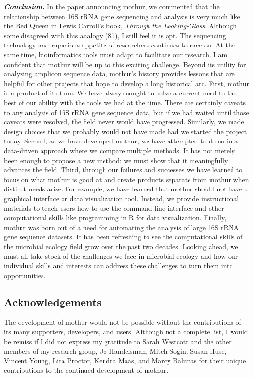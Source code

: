 \documentclass[11pt,]{article}
\begin{document}
\textbf{\emph{Conclusion.}} In the paper announcing mothur, we commented
that the relationship between 16S rRNA gene sequencing and analysis is
very much like the Red Queen in Lewis Carroll's book, \emph{Through the
Looking-Glass}. Although some disagreed with this analogy (81), I still
feel it is apt. The sequencing technology and rapacious appetite of
researchers continues to race on. At the same time, bioinformatics tools
must adapt to facilitate our research. I am confident that mothur will
be up to this exciting challenge. Beyond its utility for analyzing
amplicon sequence data, mothur's history provides lessons that are
helpful for other projects that hope to develop a long historical arc.
First, mothur is a product of its time. We have always sought to solve a
current need to the best of our ability with the tools we had at the
time. There are certainly caveats to any analysis of 16S rRNA gene
sequence data, but if we had waited until those caveats were resolved,
the field never would have progressed. Similarly, we made design choices
that we probably would not have made had we started the project today.
Second, as we have developed mothur, we have attempted to do so in a
data-driven approach where we compare multiple methods. It has not
merely been enough to propose a new method: we must show that it
meaningfully advances the field. Third, through our failures and
successes we have learned to focus on what mothur is good at and create
products separate from mothur when distinct needs arise. For example, we
have learned that mothur should not have a graphical interface or data
visualization tool. Instead, we provide instructional materials to teach
users how to use the command line interface and other computational
skills like programming in R for data visualization. Finally, mothur was
born out of a need for automating the analysis of large 16S rRNA gene
sequence datasets. It has been refreshing to see the computational
skills of the microbial ecology field grow over the past two decades.
Looking ahead, we must all take stock of the challenges we face in
microbial ecology and how our individual skills and interests can
address these challenges to turn them into opportunities.

\hypertarget{acknowledgements}{%
\subsection{Acknowledgements}\label{acknowledgements}}

The development of mothur would not be possible without the
contributions of its many supporters, developers, and users. Although
not a complete list, I would be remiss if I did not express my gratitude
to Sarah Westcott and the other members of my research group, Jo
Handelsman, Mitch Sogin, Susan Huse, Vincent Young, Lita Proctor, Kendra
Maas, and Marcy Balunas for their unique contributions to the continued
development of mothur.
\end{document}
